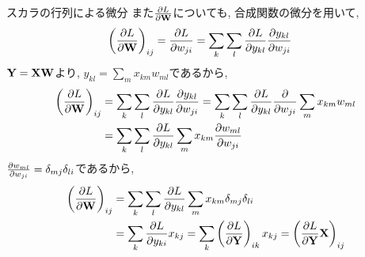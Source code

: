 \documentclass[dvipdfmx,notheorems,t]{beamer}
\begin{document}
\begin{frame}{スカラの行列による微分}
また$\pdv{L}{\vb{W}}$についても, 合成関数の微分を用いて,
\begin{align*}
  \left( \pdv{L}{\vb{W}} \right)_{ij} &= \pdv{L}{w_{ji}}
    = \sum_k \sum_l \pdv{L}{y_{kl}} \pdv{y_{kl}}{w_{ji}}
\end{align*}
$\vb{Y} = \vb{X} \vb{W}$より, $y_{kl} = \sum_m x_{km} w_{ml}$であるから,
\begin{align*}
  \left( \pdv{L}{\vb{W}} \right)_{ij}
    &= \sum_k \sum_l \pdv{L}{y_{kl}} \pdv{y_{kl}}{w_{ji}}
    = \sum_k \sum_l \pdv{L}{y_{kl}} \pdv{w_{ji}} \sum_m x_{km} w_{ml} \\
    &= \sum_k \sum_l \pdv{L}{y_{kl}} \sum_m x_{km} \pdv{w_{ml}}{w_{ji}}
\end{align*}
$\pdv{w_{ml}}{w_{ji}} = \delta_{mj} \delta_{li}$であるから,
\begin{align*}
  \left( \pdv{L}{\vb{W}} \right)_{ij}
    &= \sum_k \sum_l \pdv{L}{y_{kl}} \sum_m x_{km} \delta_{mj} \delta_{li} \\
    &= \sum_k \pdv{L}{y_{ki}} x_{kj}
    = \sum_k \left( \pdv{L}{\vb{Y}} \right)_{ik} x_{kj}
    = \left( \pdv{L}{\vb{Y}} \vb{X} \right)_{ij}
\end{align*}
\end{frame}
\end{document}
